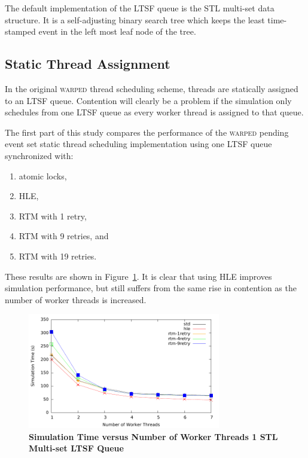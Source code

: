 \documentclass[11pt]{book}
\begin{document}
The default implementation of the LTSF queue is the STL multi-set data structure.  It is a
self-adjusting binary search tree which keeps the least time-stamped event in the left
most leaf node of the tree.

\subsection{Static Thread Assignment}

In the original \textsc{warped} thread scheduling scheme, threads are statically assigned
to an LTSF queue.  Contention will clearly be a problem if the simulation only schedules
from one LTSF queue as every worker thread is assigned to that queue.

The first part of this study compares the performance of the \textsc{warped} pending event
set static thread scheduling implementation using one LTSF queue synchronized with: 

\vspace*{-\bigskipamount}
\begin{singlespace}
\begin{enumerate}
  \item atomic locks, 
  \item HLE, 
  \item RTM with 1 retry, 
  \item RTM with 9 retries, and 
  \item RTM with 19 retries.  
\end{enumerate}
\end{singlespace}

\noindent
These results are shown in Figure~\ref{fig:noThrMig_timeVSthreads_1schq}.  It is clear
that using HLE improves simulation performance, but still suffers from the same rise in
contention as the number of worker threads is increased.


\begin{figure}
    \centering
    \graphicspath{ {./figures/} }
    \includegraphics[width=0.75\textwidth,keepaspectratio]{hugeepidemicsim-NOmig-timeVSthreads-multiset-1schQ}
    \caption{\textbf{Simulation Time versus Number of Worker Threads 1 STL Multi-set LTSF Queue}}
    \label{fig:noThrMig_timeVSthreads_1schq}
\end{figure}
\end{document}
